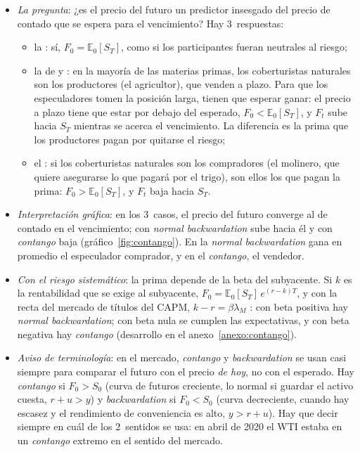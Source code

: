 \documentclass[11pt]{article}
\begin{document}
\begin{itemize}
\item \emph{La pregunta}: ¿es el precio del futuro un predictor insesgado del precio de contado que se espera para el vencimiento? Hay 3~respuestas\nocite{BodieKaneMarcus2021Investments,Hull2022Options}:
  \begin{itemize}
  \item la : sí, $F_0=\mathbb{E}_0[S_T]$, como si los participantes fueran neutrales al riesgo;
  \item la  de \textcite{Keynes1930Treatise} y \textcite{Hicks1939Value}: en la mayoría de las materias primas, los coberturistas naturales son los productores (el agricultor), que venden a plazo. Para que los especuladores tomen la posición larga, tienen que esperar ganar: el precio a plazo tiene que estar por debajo del esperado, $F_0<\mathbb{E}_0[S_T]$, y $F_t$ sube hacia $S_T$ mientras se acerca el vencimiento. La diferencia es la prima que los productores pagan por quitarse el riesgo;
  \item el : si los coberturistas naturales son los compradores (el molinero, que quiere asegurarse lo que pagará por el trigo), son ellos los que pagan la prima: $F_0>\mathbb{E}_0[S_T]$, y $F_t$ baja hacia $S_T$.
  \end{itemize}
\item \emph{Interpretación gráfica}: en los 3~casos, el precio del futuro converge al de contado en el vencimiento; con \emph{normal backwardation} sube hacia él y con \emph{contango} baja (gráfico~\ref{fig:contango}). En la \emph{normal backwardation} gana en promedio el especulador comprador, y en el \emph{contango}, el vendedor.
\item \emph{Con el riesgo sistemático}: la prima depende de la beta del subyacente. Si $k$ es la rentabilidad que se exige al subyacente, $F_0=\mathbb{E}_0[S_T]\,e^{(r-k)T}$, y con la recta del mercado de títulos del CAPM, $k-r=\beta\lambda_M$ : con beta positiva hay \emph{normal backwardation}; con beta nula se cumplen las expectativas, y con beta negativa hay \emph{contango}\nocite{Dusak1973Futures} (desarrollo en el anexo~\ref{anexo:contango}).
\item \emph{Aviso de terminología}: en el mercado, \emph{contango} y \emph{backwardation} se usan casi siempre para comparar el futuro con el precio \emph{de hoy}, no con el esperado. Hay \emph{contango} si $F_0>S_0$ (curva de futuros creciente, lo normal si guardar el activo cuesta, $r+u>y$) y \emph{backwardation} si $F_0<S_0$ (curva decreciente, cuando hay escasez y el rendimiento de conveniencia es alto, $y>r+u$). Hay que decir siempre en cuál de los 2~sentidos se usa\nocite{Hull2022Options}: en abril de 2020 el WTI estaba en un \emph{contango} extremo en el sentido del mercado.

\end{itemize}
\end{document}
